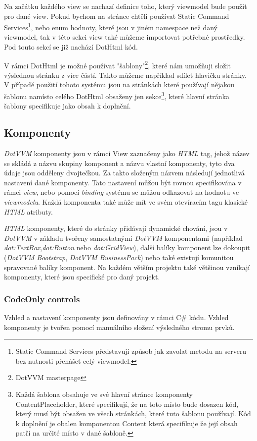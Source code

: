     Na začátku každého view se nachazí definice toho, který viewmodel bude použit pro dané view. Pokud bychom na stránce chtěli používat Static Command Services\footnote{Static Command Services představují způsob jak zavolat metodu na serveru bez nutnosti přenášet celý viewmodel.}, nebo enum hodnoty, které jsou v jiném namespace než daný viewmodel, tak v této sekci view také můžeme importovat potřebné prostředky. Pod touto sekcí se již nachází DotHtml kód.
    
    V rámci DotHtml je možné používat "šablony"\footnote{DotVVM masterpage}, které nám umožňuji složit výslednou stránku z více částí. Takto můžeme například sdílet hlavičku stránky. V případě použití tohoto systému jsou na stránkách které používají nějakou šablonu namísto celého DotHtml obsaženy jen sekce\footnote{Každá šablona obsahuje ve své hlavní stránce komponenty ContentPlaceholder, které specifikují, že na toto místo bude dosazen kód, který musí být obsažen ve všech stránkách, které tuto šablonu používají. Kód k doplnění je obalen komponentou Content která specifikuje že její obsah patří na určité místo v dané šabloně.}, které hlavní stránka šablony specifikuje jako obsah k doplnění.

\subsection*{Komponenty}
\emph{DotVVM} komponenty jsou v rámci View zaznačeny jako \emph{HTML} tag, jehož název se skládá z názvu skupiny komponent a názvu vlastní komponenty, tyto dva údaje jsou odděleny dvojtečkou. Za takto složeným názvem následují jednotlivá nastavení dané komponenty. Tato nastavení můžou být rovnou specifikována v rámci \emph{view}, nebo pomocí \emph{binding} systému se můžou odkazovat na hodnotu ve \emph{viewmodelu}. Každá komponenta také může mít ve svém otevíracím tagu klasické \emph{HTML} atributy. 

\emph{HTML} komponenty, které do stránky přidávají dynamické chování, jsou v \emph{DotVVM} v základu tvořeny samostatnými \emph{DotVVM} komponentami (například \emph{dot:TextBox},\emph{dot:Button} nebo \emph{dot:GridView}), další balíky komponent lze dokoupit (\emph{DotVVM Bootstrap}, \emph{DotVVM BusinessPack}) nebo také existují komunitou spravované balíky komponent. Na každém větším projektu také většinou vznikají komponenty, které jsou specifické pro daný projekt.

\subsubsection{CodeOnly controls}
Vzhled a nastavení komponenty jsou definovány v rámci C\# kódu.\newline
Vzhled komponenty je tvořen pomocí manuálního složení výsledného stromu prvků.

